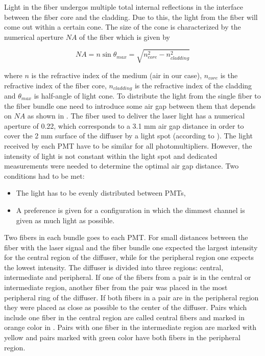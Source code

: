 Light in the fiber undergos multiple total internal reflections in the interface between the fiber core and the cladding. 
Due to this, the light from the fiber will come out within a certain cone. 
The size of the cone is characterized by the numerical aperture $NA$ of the fiber which is given by

\begin{equation}
\label{eq:numericalApperture}
 NA = n \sin{\theta_{max}} = \sqrt{n_{core}^2 - n_{cladding}^2}
\end{equation}

where $n$ is the refractive index of the medium (air in our case), $n_{core}$ is the refractive index of the fiber core, $n_{cladding}$ is the refractive index 
of the cladding and $\theta_{max}$ is half-angle of light cone. 
To distribute the light from the single fiber to the fiber bundle one need to introduce some air gap between them that depends on $NA$ 
as shown in .
The fiber used to deliver the laser light has a numerical aperture of 0.22, which corresponds to a 3.1 mm air gap distance 
in order to cover the 2 mm surface of the diffuser by a light spot (according to ).
The light received by each PMT have to be similar for all photomultipliers.
However, the intensity of light is not constant within the light spot and dedicated measurements were needed to determine the optimal air gap distance.
Two conditions had to be met:
\begin{itemize}
 \item The light has to be evenly distributed between PMTs,
 \item A preference is given for a configuration in which the dimmest channel is given as much light as possible.
\end{itemize}
Two fibers in each bundle goes to each PMT. 
For small distances between the fiber with the laser signal and the fiber bundle one expected the largest intensity for the central 
region of the diffuser, while for the peripheral region one expects the lowest intensity.
The diffuser is divided into three regions: central, intermediate and peripheral. 
If one of the fibers from a pair is in the central or intermediate region, another fiber from the pair was placed in the most peripheral ring of the diffuser.
If both fibers in a pair are in the peripheral region they were placed as close as possible to the center of the diffuser.
Pairs which include one fiber in the central region are called central fibers and marked in orange color in .
Pairs with one fiber in the intermediate region are marked with yellow and pairs marked with green color have both fibers in the peripheral region.

